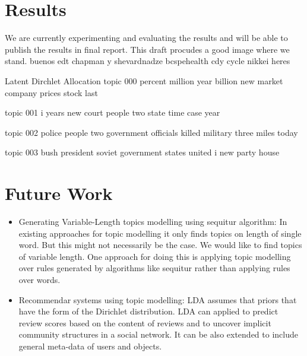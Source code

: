 \documentclass[a4paper,11pt]{article}
\begin{document}
\section{Results}
We are currently experimenting and evaluating the results and will be able to publish the results in final report. This draft procudes a good image where we stand. 
buenos
edt
chapman
y
shevardnadze
bcspehealth
cdy
cycle
nikkei
heres

Latent Dirchlet Allocation
topic 000
   percent
   million
   year
   billion
   new
   market
   company
   prices
   stock
   last


topic 001
   i
   years
   new
   court
   people
   two
   state
   time
   case
   year


topic 002
   police
   people
   two
   government
   officials
   killed
   military
   three
   miles
   today


topic 003
   bush
   president
   soviet
   government
   states
   united
   i
   new
   party
   house


\section{Future Work}

\begin{itemize}

\item Generating Variable-Length topics modelling using sequitur algorithm:
	In existing approaches for topic modelling it only finds topics on length of single word. But this might not necessarily be the case. We would like to find topics of variable length. One approach for doing this is applying topic modelling over rules generated by algorithms like sequitur rather than applying rules over words.

\item Recommendar systems using topic modelling:
	LDA assumes that priors that have the form of the Dirichlet distribution. LDA can applied to predict review scores based on the content of reviews and to uncover implicit community structures in a social network. It can be also extended to include general meta-data of users and objects.

\end{itemize}
\end{document}
